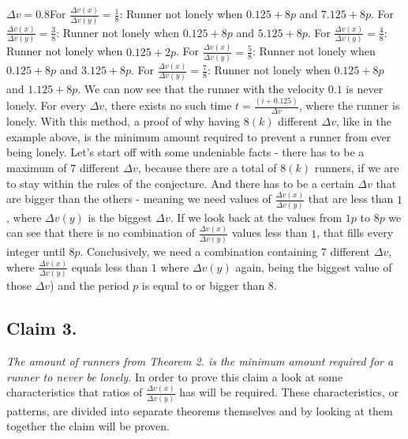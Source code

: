 \documentclass[12pt, a4paper]{article}
\begin{document}
\newline
\newline
$\Delta v = 0.8$\newline For $\frac{\Delta v(x)}{\Delta v(y)} = \frac{1}{8}$: Runner not lonely when $0.125+8p$ and $7.125+8p$. \newline For $\frac{\Delta v(x)}{\Delta v(y)} = \frac{3}{8}$: Runner not lonely when $0.125+8p$ and $5.125+8p$. \newline For $\frac{\Delta v(x)}{\Delta v(y)} = \frac{4}{8}$: Runner not lonely when $0.125+2p$. \newline For $\frac{\Delta v(x)}{\Delta v(y)} = \frac{5}{8}$: Runner not lonely when $0.125+8p$ and $3.125+8p$. \newline For $\frac{\Delta v(x)}{\Delta v(y)} = \frac{7}{8}$: Runner not lonely when $0.125+8p$ and $1.125+8p$.
\newline
\newline
We can now see that the runner with the velocity $0.1$ is never lonely. 
For every $\Delta v$, there exists no such time $t = \frac{(i+0.125)}{\Delta v}$, where the runner is lonely. 
With this method, a proof of why having $8(k)$ different $\Delta v$, like in the example above, is the minimum amount required to prevent a runner from ever being lonely. Let's start off with some undeniable facts - there has to be a maximum of $7$ different $\Delta v$, because there are a total of $8 (k)$ runners, if we are to stay within the rules of the conjecture. And there has to be a certain $\Delta v$ that are bigger than the others - meaning we need values of $\frac{\Delta v(x)}{\Delta v(y)}$ that are less than $1$, where $\Delta v(y)$ is the biggest $\Delta v$.
\newline
\newline
If we look back at the values from $1p$ to $8p$ we can see that there is no combination of $\frac{\Delta v(x)}{\Delta v(y)}$ values less than $1$, that fills every integer until $8p$. Conclusively, we need a combination containing $7$ different $\Delta v$, where $\frac{\Delta v(x)}{\Delta v(y)}$ equals less than $1$ where $\Delta v(y)$ again, being the biggest value of those $\Delta v$) and the period $p$ is equal to or bigger than $8$.

\subsection*{Claim 3.}\textit{The amount of runners from Theorem 2. is the minimum amount required for a runner to never be lonely.}
\newline
\newline
In order to prove this claim a look at some characteristics that ratios of $\frac{\Delta v(x)}{\Delta v(y)}$ has will be required. These characteristics, or patterns, are divided into separate theorems themselves and by looking at them together the claim will be proven.
\end{document}
